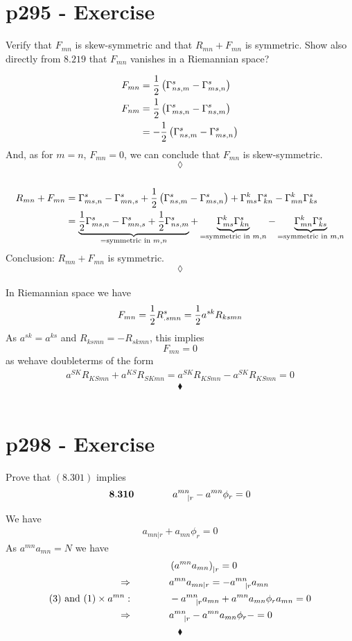 \section{p295 - Exercise}
\begin{tcolorbox}
Verify that $F_{mn}$ is skew-symmetric and that $R_{mn}+F_{mn}$ is symmetric. Show also directly from $8.219$ that $F_{mn}$ vanishes in a Riemannian space?
\end{tcolorbox}
\begin{align}
F_{mn} &= \frac{1}{2}\left( \Gamma^s_{ns,m}-\Gamma^s_{ms,n} \right)\\
F_{nm} &= \frac{1}{2}\left( \Gamma^s_{ms,n}-\Gamma^s_{ns,m} \right)\\
&= -\frac{1}{2}\left( \Gamma^s_{ns,m}-\Gamma^s_{ms,n} \right)
\end{align}
And, as for $m=n$, $F_{mn} = 0$, we can conclude that $F_{mn}$ is skew-symmetric.
$$\lozenge$$\\
\begin{align}
R_{mn} +F_{mn} &=  \Gamma^s_{ms,n}-\Gamma^s_{mn,s}+\frac{1}{2}\left( \Gamma^s_{ns,m}-\Gamma^s_{ms,n} \right)+\Gamma^k_{ms}\Gamma^s_{kn}-\Gamma^k_{mn}\Gamma^s_{ks}\\
&=  \underbrace{\frac{1}{2} \Gamma^s_{ms,n}-\Gamma^s_{mn,s}+\frac{1}{2} \Gamma^s_{ns,m}}_{=\text{symmetric in } m,n} +\underbrace{\Gamma^k_{ms}\Gamma^s_{kn}}_{=\text{symmetric in } m,n}-\underbrace{\Gamma^k_{mn}\Gamma^s_{ks}}_{=\text{symmetric in } m,n}\\
\end{align}
Conclusion: $R_{mn} +F_{mn}$ is symmetric.
$$\lozenge$$\\
In Riemannian space we have $$F_{mn} = \frac{1}{2} R^s_{.smn} = \frac{1}{2} a^{sk}R_{ksmn}$$
As $a^{sk}= a^{ks}$ and $R_{ksmn}= - R_{skmn}$, this implies
$$F_{mn}=0$$ as wehave doubleterms of the form
\begin{align*}
a^{SK}R_{KSmn} + a^{KS}R_{SKmn} = a^{SK}R_{KSmn} - a^{SK}R_{KSmn} = 0
\end{align*}
$$\blacklozenge$$\\
\newpage

\section{p298 - Exercise}
\begin{tcolorbox}
Prove that $\mathbf{(8.301)}$ implies
$$\mathbf{8.310}\quad\quad\quad\quad a^{mn}_{\quad |r} - a^{mn}\phi_r=0$$
\end{tcolorbox}
We have 
\begin{align}
 a_{mn|r} + a_{mn}\phi_r=0
 \end{align}
 As $a^{mn}a_{mn}= N$ we have 
 \begin{align}
 &\left(a^{mn}a_{mn}\right)_{|r}=0\\
 \Rightarrow \quad\quad\quad\quad &a^{mn}a_{mn|r}=-a^{mn}_{\quad |r}a_{mn}\\
 (3) \text{ and } (1) \times a^{mn}:\quad\quad\quad\quad &-a^{mn}_{\quad |r}a_{mn}+ a^{mn}a_{mn}\phi_ra_{mn}=0\\
 \Rightarrow \quad\quad\quad\quad &a^{mn}_{\quad |r}-a^{mn}a_{mn}\phi_r-=0
 \end{align}
$$\blacklozenge$$\\

